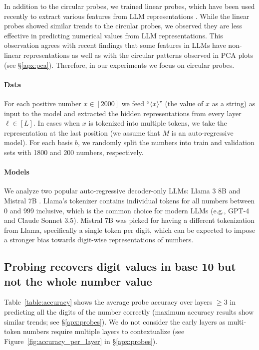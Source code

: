 \documentclass[11pt]{article}
\begin{document}
In addition to the circular probes, we trained linear probes, which have been used recently to extract various features from LLM representations \citep{belinkov-2022-probing, park2023the, gurnee2024language}. While the linear probes showed similar trends to the circular probes, we observed they are less effective in predicting numerical values from LLM representations. This observation agrees with recent findings that some features in LLMs have non-linear representations \citep{engels2024languagemodelfeatureslinear} as well as with the circular patterns observed in PCA plots (see \S\ref{apx:pca}). Therefore, in our experiments we focus on circular probes.




\paragraph{Data} 
For each positive number $x\in[2000]$ we feed $\text{``}\langle x\rangle\text{''}$ (the value of $x$ as a string) as input to the model and extracted the hidden representations from every layer $\ell\in [L]$. In cases when $x$ is tokenized into multiple tokens, we take the representation at the last position (we assume that $M$ is an auto-regressive model).
For each basis $b$, we randomly split the numbers into train and validation sets with 1800 and 200 numbers, respectively. 

\paragraph{Models}
We analyze two popular auto-regressive decoder-only LLMs: Llama 3 8B \citep{dubey2024llama3herdmodels} and Mistral 7B \citep{jiang2023mistral7b}. Llama's tokenizer contains individual tokens for all numbers between 0 and 999 inclusive, which is the common choice for modern LLMs (e.g., GPT-4 \citet{singh2024tokenizationcountsimpacttokenization} and Claude Sonnet 3.5). Mistral 7B was picked for having a different tokenization from Llama, specifically a single token per digit, which can be expected to impose a stronger bias towards digit-wise representations of numbers.




\subsection{Probing recovers digit values in base 10 but not the whole number value}

Table~\ref{table:accuracy} shows the average probe accuracy over layers $\geq 3$ in predicting all the digits of the number correctly (maximum accuracy results show similar trends; see \S\ref{apx:probes}). We do not consider the early layers as multi-token numbers require multiple layers to contextualize (see Figure~\ref{fig:accuracy_per_layer} in \S\ref{apx:probes}).
\end{document}
